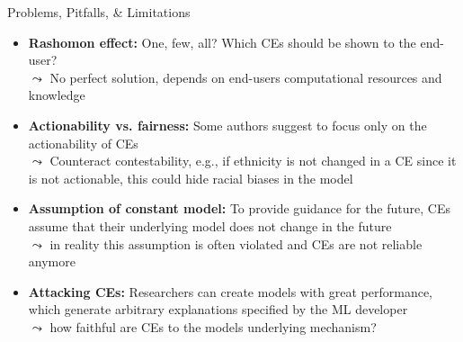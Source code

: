 \documentclass[11pt,compress,t,notes=noshow, aspectratio=169, xcolor=table]{beamer}
\begin{document}
\begin{frame}{Problems, Pitfalls, \& Limitations}
\begin{itemize}[<+->]
    \item \textbf{Rashomon effect:} One, few, all? Which CEs should be shown to the end-user?\\
    $\leadsto$ No perfect solution, depends on end-users computational resources and knowledge
    \item \textbf{Actionability vs. fairness:} Some authors suggest to focus only on the actionability of CEs\\
    $\leadsto$ Counteract contestability, e.g., if ethnicity is not changed in a CE since it is not actionable, this could hide racial biases in the model
    \item \textbf{Assumption of constant model:} To provide guidance for the future, CEs assume that their underlying model does not change in the future\\
    $\leadsto$ in reality this assumption is often violated and CEs are not reliable anymore 
    \item \textbf{Attacking CEs:} Researchers can create models with great performance, which generate arbitrary explanations specified by the ML developer\\
    $\leadsto$ how faithful are CEs to the models underlying mechanism?
\end{itemize}

\end{frame}

\endlecture
\end{document}
